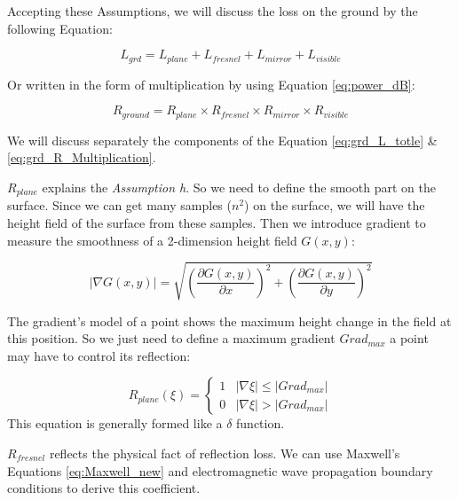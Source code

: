\documentclass{mcmthesis}
\begin{document}
    Accepting these Assumptions, we will discuss the loss on the ground by the following Equation:

    \begin{equation}\label{eq:grd_L_totle}
      L_{grd} = L_{plane} + L_{fresnel} + L_{mirror} + L_{visible}
    \end{equation}

    Or written in the form of multiplication by using Equation \ref{eq:power_dB}:

    \begin{equation}\label{eq:grd_R_Multiplication}
      R_{ground} = R_{plane} \times R_{fresnel} \times R_{mirror} \times R_{visible}
    \end{equation}

    We will discuss separately the components of the Equation \ref{eq:grd_L_totle} \& \ref{eq:grd_R_Multiplication}.

    $R_{plane}$ explains the \emph{Assumption h}. So we need to define the smooth part on the surface. Since we can get many samples ($n^2$) on the surface, we will have the height field of the surface from these samples. Then we introduce gradient to measure the smoothness of a 2-dimension height field $G(x,y)$:

      \begin{equation}\label{eq:gradient}
        |\nabla G(x,y)| = \sqrt{(\frac{\partial G(x,y)}{\partial x})^2 + (\frac{\partial G(x,y)}{\partial y})^2}
      \end{equation}

    The gradient's model of a point shows the maximum height change in the field at this position. So we just need to define a maximum gradient $Grad_{max}$ a point may have to control its reflection:

      \begin{equation}\label{eq:R_plane}
        R_{plane}(\xi) =
        \begin{cases}
          1&\text{$|\nabla \xi| \leq |Grad_{max}|$}\\
          0&\text{$|\nabla \xi| > |Grad_{max}|$}
        \end{cases}
      \end{equation}
      This equation is generally formed like a $\delta$ function.

    $R_{fresnel}$ reflects the physical fact of reflection loss. We can use Maxwell's Equations \ref{eq:Maxwell_new} and electromagnetic wave propagation boundary conditions to derive this coefficient\cite{Hainan}.
\end{document}
